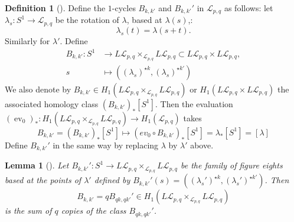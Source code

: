 \documentclass[reqno]{amsart}
\newtheorem{lemma}[theorem]{Lemma}
\theoremstyle{definition}
\newtheorem{definition}[theorem]{Definition}
\theoremstyle{remark}
\DeclareMathOperator{\ev}{ev}
\begin{document}
\begin{definition}[]
    Define the $1$-cycles $B_{k,k'}$ and
    $B_{k,k'}'$ in
    $\mathcal{L}_{p,q}$ as follows:
    let $\lambda_s \colon S^{1} \to \mathcal{L}_{p,q}$ be the
    rotation of $\lambda$, based at $\lambda(s)$,:
    \[
    \lambda_s (t) = \lambda (s+t).
    \] 
    Similarly for $\lambda'$.
    Define
    \begin{align*}
        B_{k,k'} \colon S^{1} 
        &\to L \mathcal{L}_{p,q} \times_{\mathcal{L}_{p,q}}
        L \mathcal{L}_{p,q} \subset L \mathcal{L}_{p,q} \times 
        L \mathcal{L}_{p,q},\\
        s 
        &\mapsto \left( (\lambda_s)^{\star k},
        (\lambda_s)^{\star k' }\right) 
    \end{align*}
    We also denote by
    $B_{k,k'} \in H_1 \left( L \mathcal{L}_{p,q}
    \times_{\mathcal{L}_{p,q}} L \mathcal{L}_{p,q} \right) $ 
    or $H_1 \left( L \mathcal{L}_{p,q} \times L \mathcal{L}_{p,q} \right) $ 
    the associated homology class
    $\left( B_{k,k'} \right)_* \left[ S^{1} \right] $.
    Then the evaluation $\left( \ev_0 \right)_* \colon
    H_1 \left( L \mathcal{L}_{p,q} \times_{\mathcal{L}_{p,q}}
    L \mathcal{L}_{p,q}\right) \to 
    H_1 \left( \mathcal{L}_{p,q} \right) $ takes
     \[
     B_{k,k'} = \left( B_{k,k'} \right)_* \left[ S^{1} \right] 
     \mapsto \left( ev_0 \circ B_{k,k'} \right)_* \left[ S^{1} \right] 
     = \lambda_* \left[ S^{1} \right] = 
     \left[ \lambda \right] 
     \] 
     Define $B_{k,k'}'$ in the same way by
     replacing $\lambda$ by $\lambda'$ above.
\end{definition}




\begin{lemma}[]\cite[Lemma 2.6]{Naef-Rivera-Wahl}
    Let $B_{k,k'}' \colon S^{1} \to L \mathcal{L}_{p,q} \times_{
    \mathcal{L}_{p,q}} L \mathcal{L}_{p,q}$ be the family of
    figure eights based at the points of $\lambda'$ defined
    by $B_{k,k'}'(s) = 
    \left( (\lambda_s')^{\star k}, (\lambda_s')^{\star k'} \right) $. Then
    \[
    B_{k,k'} = q B_{qk,qk'}' \in 
    H_1 \left( L \mathcal{L}_{p,q} 
    \times_{\mathcal{L}_{p,q}} L \mathcal{L}_{p,q} \right) 
    \] 
    is the sum of $q$ copies of the class
    $B_{qk,qk'}'$.
\end{lemma}
\end{document}
